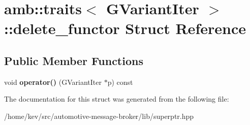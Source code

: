 \hypertarget{structamb_1_1traits_3_01GVariantIter_01_4_1_1delete__functor}{\section{amb\+:\+:traits$<$ G\+Variant\+Iter $>$\+:\+:delete\+\_\+functor Struct Reference}
\label{structamb_1_1traits_3_01GVariantIter_01_4_1_1delete__functor}
}
\subsection*{Public Member Functions}
\begin{DoxyCompactItemize}
\item 
\hypertarget{structamb_1_1traits_3_01GVariantIter_01_4_1_1delete__functor_a28037ddb5e64f1e716abbaa840db1ad5}{void {\bfseries operator()} (G\+Variant\+Iter $\ast$p) const }\label{structamb_1_1traits_3_01GVariantIter_01_4_1_1delete__functor_a28037ddb5e64f1e716abbaa840db1ad5}

\end{DoxyCompactItemize}


The documentation for this struct was generated from the following file\+:\begin{DoxyCompactItemize}
\item 
/home/kev/src/automotive-\/message-\/broker/lib/superptr.\+hpp\end{DoxyCompactItemize}
